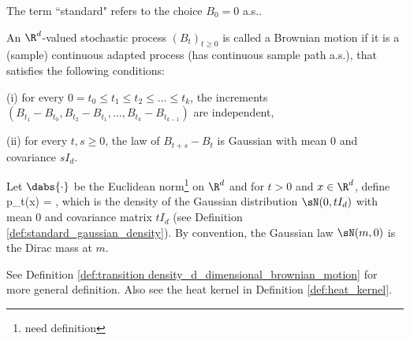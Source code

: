 \begin{remark}
The term ``standard" refers to the choice $B_0 = 0$ a.s..%
\end{remark}

\begin{definition}\label{def:brownian_motion_d}
An $\R^d$-valued stochastic process $(B_t)_{t \geq 0}$ is called a Brownian motion if it is a (sample) continuous adapted process (has continuous sample path a.s.), that satisfies the following conditions:
\ben
\item [(i)] for every $0 = t_0 \leq t_1 \leq t_2 \leq \dots \leq t_k$, the increments $(B_{t_1} - B_{t_0} ,B_{t_2} - B_{t_1} ,\dots, B_{t_k} - B_{t_{k-1}})$ are independent,
\item [(ii)] for every $t, s \geq 0$, the law of $B_{t+s} - B_t$ is Gaussian with mean 0 and covariance $sI_d$.%
\een
\end{definition}

\begin{definition}\label{def:transition density_standard_brownian_motion}
Let $\dabs{\cdot}$ be the Euclidean norm\footnote{need definition} on $\R^d$ and for $t > 0$ and $x \in \R^d$, define
\be
p_t(x) =  \exp{},
\ee
which is the density of the Gaussian distribution $\sN(0, tI_d)$ with mean 0 and covariance matrix $tI_d$ (see Definition \ref{def:standard_gaussian_density}). By convention, the Gaussian law $\sN(m, 0)$ is the Dirac mass at $m$.
\end{definition}

\begin{remark}
See Definition \ref{def:transition density_d_dimensional_brownian_motion} for more general definition. Also see the heat kernel in Definition \ref{def:heat_kernel}.
\end{remark}



